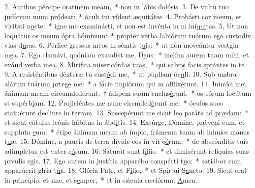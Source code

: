 2. Auribus pércipe oratinem m\uline{e}am,~* non in lábis dol\uline{ó}sis.
3. De vultu tuo judícium mum pr\uline{ó}deat:~* óculi tui vídent æquit\uline{á}tes.
4. Probásti cor meum, et visitsti n\uline{o}cte:~* igne me examinásti, et non est invénta in m iní\uline{qui}tas.
5. Ut non loquátur os meum ópra h\uline{ó}minum:~* propter verba labiórum tuórum ego custodív vias d\uline{u}ras.
6. Pérfice gressus meos in sémtis t\uline{u}is:~* ut non moveántur vestgia m\uline{e}a.
7. Ego clamávi, quóniam exaudíst me, D\uline{e}us:~* inclína aurem tuam mihi, et exáud verba m\uline{e}a.
8. Mirífica misericórdas t\uline{u}as,~* qui salvos facis sprántes \uline{i}n te.
9. A resisténtibus déxteræ tu cust\uline{ó}di me,~* ut pupllam óc\uline{u}li.
10. Sub umbra alárum tuárum prteg\uline{e} me:~* a fácie impiórum qui m afflix\uline{é}runt.
11. Inimíci mei ánimam meam circumdedérunt,~† ádipem suum cnclus\uline{é}runt:~* os eórum locútum st supérb\uline{i}am.
12. Projiciéntes me nunc circmded\uline{é}runt me:~* óculos suos statuérunt declinre in t\uline{e}rram.
13. Suscepérunt me sicut leo paráts ad pr\uline{æ}dam:~* et sicut cátulus leónis hábitns in ábd\uline{i}tis.
14. Exsúrge, Dómine, prǽveni eum, et supplnta \uline{e}um:~* éripe ánimam meam ab ímpio, frámeam tuam ab inimícs manus t\uline{u}æ.
15. Dómine, a paucis de terra dívide eos in vit e\uline{ó}rum:~* de abscónditis tuis adimplétus est vnter e\uline{ó}rum.
16. Saturát sunt f\uline{í}liis:~* et dimisérunt relíquias suas prvulis s\uline{u}is.
17. Ego autem in justítia apparébo conspécti t\uline{u}o:~* satiábor cum apparúerit glria t\uline{u}a.
18. Glória Patr, et F\uline{í}lio,~* et Spirtui S\uline{a}ncto.
19. Sicut erat in princípio, et nnc, et s\uline{e}mper,~* et in sǽcula sæclórum. \uline{A}men.
